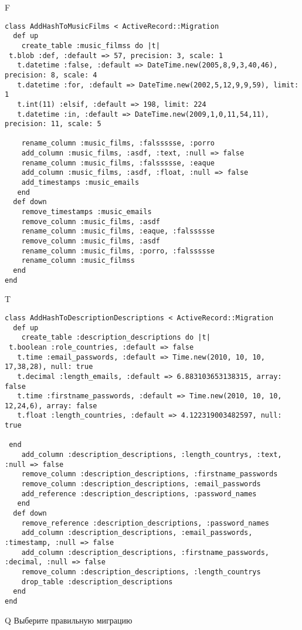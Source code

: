 F
\begin{verbatim}
class AddHashToMusicFilms < ActiveRecord::Migration
  def up
    create_table :music_filmss do |t| 
 t.blob :def, :default => 57, precision: 3, scale: 1
   t.datetime :false, :default => DateTime.new(2005,8,9,3,40,46), precision: 8, scale: 4
   t.datetime :for, :default => DateTime.new(2002,5,12,9,9,59), limit: 1
   t.int(11) :elsif, :default => 198, limit: 224
   t.datetime :in, :default => DateTime.new(2009,1,0,11,54,11), precision: 11, scale: 5

    rename_column :music_films, :falssssse, :porro
    add_column :music_films, :asdf, :text, :null => false
    rename_column :music_films, :falssssse, :eaque
    add_column :music_films, :asdf, :float, :null => false
    add_timestamps :music_emails
   end
  def down
    remove_timestamps :music_emails
    remove_column :music_films, :asdf
    rename_column :music_films, :eaque, :falssssse
    remove_column :music_films, :asdf
    rename_column :music_films, :porro, :falssssse
    rename_column :music_filmss
  end
end
\end{verbatim}

T
\begin{verbatim}
class AddHashToDescriptionDescriptions < ActiveRecord::Migration
  def up
    create_table :description_descriptions do |t|
 t.boolean :role_countries, :default => false
   t.time :email_passwords, :default => Time.new(2010, 10, 10, 17,38,28), null: true
   t.decimal :length_emails, :default => 6.883103653138315, array: false
   t.time :firstname_passwords, :default => Time.new(2010, 10, 10, 12,24,6), array: false
   t.float :length_countries, :default => 4.122319003482597, null: true

 end
    add_column :description_descriptions, :length_countrys, :text, :null => false
    remove_column :description_descriptions, :firstname_passwords
    remove_column :description_descriptions, :email_passwords
    add_reference :description_descriptions, :password_names
   end
  def down
    remove_reference :description_descriptions, :password_names
    add_column :description_descriptions, :email_passwords, :timestamp, :null => false
    add_column :description_descriptions, :firstname_passwords, :decimal, :null => false
    remove_column :description_descriptions, :length_countrys
    drop_table :description_descriptions
  end
end
\end{verbatim}
Q
Выберите правильную миграцию

